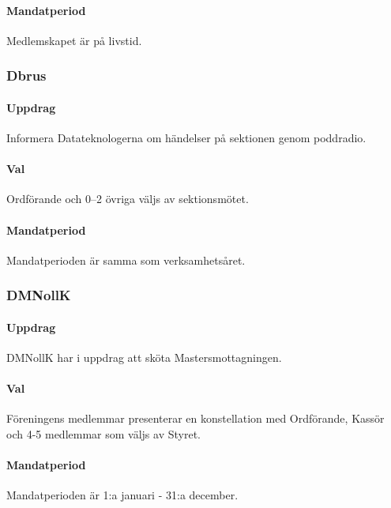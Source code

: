 \paragraph{Mandatperiod}
Medlemskapet är på livstid.
\subsubsection{Dbrus}
\paragraph{Uppdrag}
Informera Datateknologerna om händelser på sektionen genom poddradio.
\paragraph{Val}
Ordförande och 0–2 övriga väljs av sektionsmötet.
\paragraph{Mandatperiod}
Mandatperioden är samma som verksamhetsåret.
\subsubsection{DMNollK}
\paragraph{Uppdrag}
DMNollK har i uppdrag att sköta Mastersmottagningen.
\paragraph{Val}
Föreningens medlemmar presenterar en konstellation med Ordförande, Kassör och 4-5 medlemmar som väljs av Styret.

\paragraph{Mandatperiod}
Mandatperioden är 1:a januari - 31:a december.
\newpage
